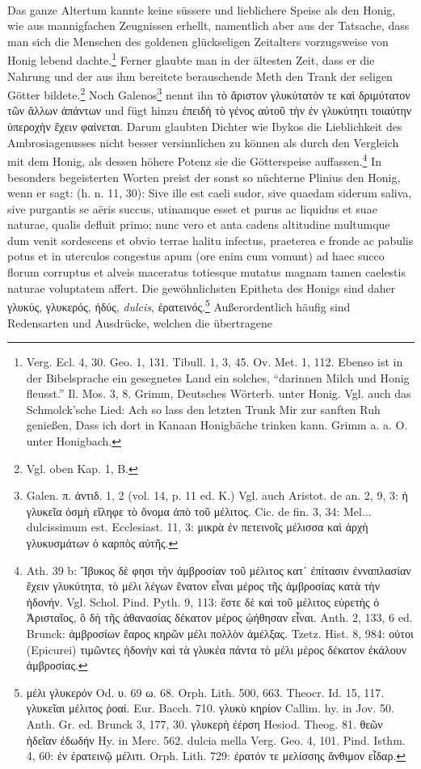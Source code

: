 \documentclass[a4paper, 11pt, oneside]{article}
\begin{document}
\paragraph{}
Das ganze Altertum kannte keine süssere und lieblichere Speise als den Honig, wie aus mannigfachen Zeugnissen erhellt, namentlich aber aus der Tatsache, dass man sich die Menschen des goldenen glückseligen Zeitalters vorzugsweise von Honig lebend dachte.\footnote{Verg. Ecl. 4, 30. Geo. 1, 131. Tibull. 1, 3, 45. Ov. Met. 1, 112. Ebenso ist in der Bibelsprache ein gesegnetes Land ein solches, "`darinnen Milch und Honig fleusst."' Il. Mos. 3, 8. Grimm, Deutsches Wörterb. unter Honig. Vgl. auch das Schmolck'sche Lied: Ach so lass den letzten Trunk Mir zur sanften Ruh genießen, Dass ich dort in Kanaan Honigbäche trinken kann. Grimm a. a. O. unter Honigbach.} Ferner glaubte man in der ältesten Zeit, dass er die Nahrung und der aus ihm bereitete berauschende Meth den Trank der seligen Götter bildete.\footnote{Vgl. oben Kap. 1, B.} Noch Galenos\footnote{Galen. π. ἀντιδ. 1, 2 (vol. 14, p. 11 ed. K.) Vgl. auch Aristot. de an. 2, 9, 3: ἡ γλυκεῖα ὀσμὴ εἴληφε τὸ ὄνομα ἀπὸ τοῦ μέλιτος. Cic. de fin. 3, 34: Mel... dulcissimum est. Ecclesiast. 11, 3: μικρὰ ἐν πετεινοῖς μέλισσα καὶ ἀρχὴ γλυκυσμάτων ὁ καρπὸς αὐτῆς.} nennt ihn τὸ ἄριστον γλυκύτατόν τε καὶ δριμύτατον τῶν ἄλλων ἁπάντων und fügt hinzu ἐπειδὴ τὸ γένος αὐτοῦ τὴν ἐν γλυκύτητι τοιαύτην ὑπεροχὴν ἔχειν φαίνεται. Darum glaubten Dichter wie Ibykos die Lieblichkeit des Ambrosiagenusses nicht besser versinnlichen zu können als durch den Vergleich mit dem Honig, als dessen höhere Potenz sie die Götterspeise auffassen.\footnote{Ath. 39 b: Ἴβυκος δὲ φησι τὴν ἀμβροσίαν τοῦ μέλιτος κατ᾽ ἐπίτασιν ἐνναπλασίαν ἔχειν γλυκύτητα, τὸ μέλι λέγων ἔνατον εἶναι μέρος τῆς ἀμβροσίας κατὰ τὴν ἡδονήν. Vgl. Schol. Pind. Pyth. 9, 113: ἔστε δὲ καὶ τοῦ μέλιτος εὑρετὴς ὁ Ἀρισταῖος, ὃ δὴ τῆς ἀθανασίας δέκατον μέρος ᾠήθησαν εἶναι. Anth. 2, 133, 6 ed. Brunck: ἀμβροσίων ἔαρος κηρῶν μέλι πολλὸν ἀμέλξας. Tzetz. Hist. 8, 984: οὑτοι (Epicurei) τιμῶντες ἡδονὴν καὶ τὰ γλυκέα πάντα τὸ μέλι μέρος δέκατον ἐκάλουν ἀμβροσίας.} In besonders begeisterten Worten preist der sonst so nüchterne Plinius den Honig, wenn er sagt: (h. n. 11, 30): Sive ille est caeli sudor, sive quaedam siderum saliva, sive purgantis se aëris succus, utinamque esset et purus ac liquidus et suae naturae, qualis defluit primo; nunc vero et anta cadens altitudine multumque dum venit sordescens et obvio terrae halitu infectus, praeterea e fronde ac pabulis potus et in uterculos congestus apum (ore enim cum vomunt) ad haec succo florum corruptus et alveis maceratus totiesque mutatus magnam tamen caelestis naturae voluptatem affert. Die gewöhnlichsten Epitheta des Honigs sind daher γλυκύς, γλυκερός, ἡδύς, \emph{dulcis}, ἐρατεινός.\footnote{μέλι γλυκερόν Od. υ. 69 ω. 68. Orph. Lith. 500, 663. Theocr. Id. 15, 117. γλυκεῖαι μέλιτος ῥοαί. Eur. Bacch. 710. γλυκὺ κηρίον Callim. hy. in Jov. 50. Anth. Gr. ed. Brunck 3, 177, 30. γλυκερὴ ἐέρση Hesiod. Theog. 81. θεῶν ἡδεῖαν ἐδωδήν Hy. in Merc. 562. dulcia mella Verg. Geo. 4, 101. Pind. Isthm. 4, 60: ἐν ἐρατεινῷ μέλιτι. Orph. Lith. 729: ἐρατόν τε μελίσσης ἄνθιμον εἶδαρ.} Außerordentlich häufig sind Redensarten und Ausdrücke, welchen die übertragene 
\end{document}
